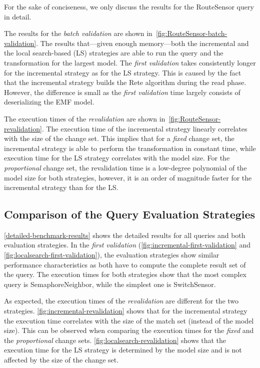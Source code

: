 \documentclass[submission,copyright,creativecommons]{eptcs}
\begin{document}
For the sake of conciseness, we only discuss the results for the \textsf{RouteSensor} query in detail. 

The results for the \emph{batch validation} are shown in~\autoref{fig:RouteSensor-batch-validation}. The results that---given enough memory---both the incremental and the local search-based (LS) strategies are able to run the query and the transformation for the largest model. The \emph{first validation} takes consistently longer for the incremental strategy as for the LS strategy. This is caused by the fact that the incremental strategy builds the Rete algorithm during the \textsf{read} phase. However, the difference is small as the \emph{first validation} time largely consists of deserializing the EMF model.

The execution times of the \emph{revalidation} are shown in~\autoref{fig:RouteSensor-revalidation}. The execution time of the incremental strategy linearly correlates with the size of the change set. This implies that for a \emph{fixed} change set, the incremental strategy is able to perform the transformation in constant time, while execution time for the LS strategy correlates with the model size. For the \emph{proportional} change set, the revalidation time is a low-degree polynomial of the model size for both strategies, however, it is an order of magnitude faster for the incremental strategy than for the LS.

\subsection{Comparison of the Query Evaluation Strategies}

\autoref{detailed-benchmark-results} shows the detailed results for all queries and both evaluation strategies. In the \emph{first validation} (\autoref{fig:incremental-first-validation} and \autoref{fig:localsearch-first-validation}), the evaluation strategies show similar performance characteristics as both have to compute the complete result set of the query. The execution times for both strategies show that the most complex query is \textsf{SemaphoreNeighbor}, while the simplest one is \textsf{SwitchSensor}. 

As expected, the execution times of the \emph{revalidation} are different for the two strategies. \autoref{fig:incremental-revalidation} shows that for the incremental strategy the execution time correlates with the size of the match set (instead of the model size). This can be observed when comparing the execution times for the \emph{fixed} and the \emph{proportional} change sets. \autoref{fig:localsearch-revalidation} shows that the execution time for the LS strategy is determined by the model size and is not affected by the size of the change set.
\end{document}
